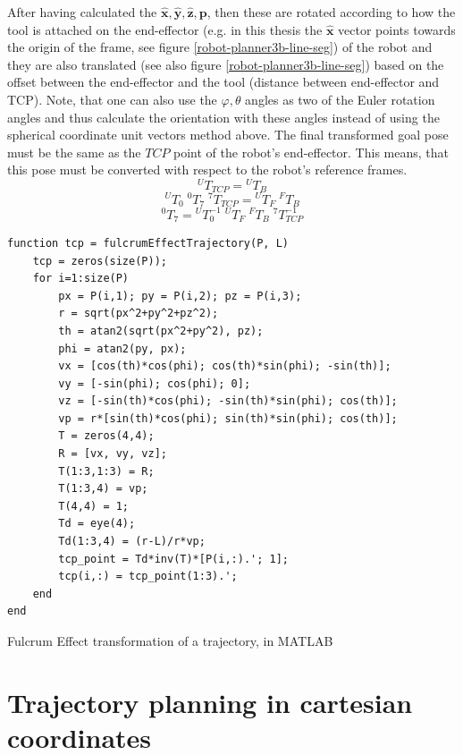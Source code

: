 After having calculated the $\hat{\mathbf{x}},\hat{\mathbf{y}},\hat{\mathbf{z}},\mathbf{p}$, then these are rotated according to how the tool is attached on the end-effector (e.g. in this thesis the $\hat{\mathbf{x}}$ vector 
points towards the origin of the frame, see figure \ref{robot-planner3b-line-seg}) of the robot and they are also translated (see also figure \ref{robot-planner3b-line-seg})
based on the offset between the end-effector and the tool (distance between end-effector and TCP). Note, that one can also use the $φ,θ$ angles as two of the Euler rotation angles and thus calculate the orientation 
with these angles instead of using the spherical coordinate unit vectors method above.
The final transformed goal pose must be the same as the $TCP$ point of the robot's end-effector. This means, that this pose must be converted with respect to the robot's reference frames.
\[
{}^{U}T^{}_{TCP} = {}^{U}T^{}_{B}
\]
\[
{}^{U}T^{}_{0} \; {}^{0}T^{}_{7} \; {}^{7}T^{}_{TCP} = {}^{U}T^{}_{F} \; {}^{F}T^{}_{B}
\]
\begin{equation}
{}^{0}T^{}_{7} = {}^{U}T^{-1}_{0} \; {}^{U}T^{}_{F} \; {}^{F}T^{}_{B} \; {}^{7}T^{-1}_{TCP}
\end{equation}

\begin{listing}[H]
\begin{verbatim}
function tcp = fulcrumEffectTrajectory(P, L)
    tcp = zeros(size(P));
    for i=1:size(P)
        px = P(i,1); py = P(i,2); pz = P(i,3);
        r = sqrt(px^2+py^2+pz^2);
        th = atan2(sqrt(px^2+py^2), pz);
        phi = atan2(py, px);
        vx = [cos(th)*cos(phi); cos(th)*sin(phi); -sin(th)];
        vy = [-sin(phi); cos(phi); 0];
        vz = [-sin(th)*cos(phi); -sin(th)*sin(phi); cos(th)];
        vp = r*[sin(th)*cos(phi); sin(th)*sin(phi); cos(th)];
        T = zeros(4,4);
        R = [vx, vy, vz];
        T(1:3,1:3) = R;
        T(1:3,4) = vp;
        T(4,4) = 1;
        Td = eye(4);
        Td(1:3,4) = (r-L)/r*vp;
        tcp_point = Td*inv(T)*[P(i,:).'; 1];
        tcp(i,:) = tcp_point(1:3).';
    end
end
\end{verbatim}
\caption{Fulcrum Effect transformation of a trajectory, in MATLAB}
\label{code:fulcrum_effect_traj_matlab}
\end{listing}


\section{Trajectory planning in cartesian coordinates}
\label{section:pivot-motions}


